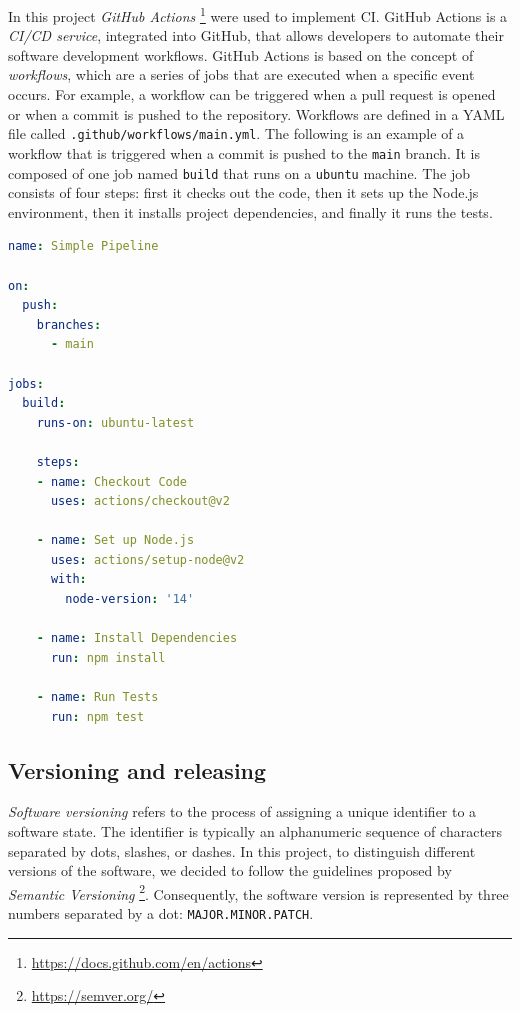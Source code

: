 \documentclass[12pt,a4paper,openright,twoside]{book}
\begin{document}
In this project \emph{GitHub Actions} \footnote{\url{https://docs.github.com/en/actions}} were used to implement CI. 
    GitHub Actions is a \emph{CI/CD service}, integrated into GitHub, that allows developers to automate their software development workflows. 
    GitHub Actions is based on the concept of \emph{workflows}, which are a series of jobs that are executed when a specific event occurs. 
    For example, a workflow can be triggered when a pull request is opened or when a commit is pushed to the repository. 
    Workflows are defined in a YAML file called \texttt{.github/workflows/main.yml}. 
    The following is an example of a workflow that is triggered when a commit is pushed to the \texttt{main} branch. It is composed 
    of one job named \texttt{build} that runs on a \texttt{ubuntu} machine. The job consists of four steps: first it checks out the code, 
    then it sets up the Node.js environment, then it installs project dependencies, and finally it runs the tests.

\begin{lstlisting}[language=yaml]
name: Simple Pipeline

on:
  push:
    branches:
      - main

jobs:
  build:
    runs-on: ubuntu-latest

    steps:
    - name: Checkout Code
      uses: actions/checkout@v2

    - name: Set up Node.js
      uses: actions/setup-node@v2
      with:
        node-version: '14'

    - name: Install Dependencies
      run: npm install

    - name: Run Tests
      run: npm test
\end{lstlisting}

\subsection*{Versioning and releasing}

\emph{Software versioning} refers to the process of assigning a unique identifier to a software state. 
    The identifier is typically an alphanumeric sequence of characters separated by dots, slashes, or dashes.
    In this project, to distinguish different versions of the software, we decided to follow the guidelines 
    proposed by \emph{Semantic Versioning} \footnote{\url{https://semver.org/}}. 
    Consequently, the software version is represented by three numbers separated by a dot: \texttt{MAJOR.MINOR.PATCH}.
\end{document}
